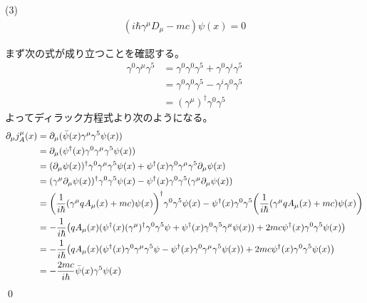 \documentclass[uplatex,dvipdfmx,a4paper,11pt]{jlreq}
\makeatletter
\theoremstyle{definition}
\renewenvironment{proof}[1][\proofname]{\par
  \normalfont
  \topsep6\p@\@plus6\p@ \trivlist
  \item[\hskip\labelsep{\bfseries #1}\@addpunct{\bfseries}]\ignorespaces\quad\par
}{%
  \qed\endtrivlist\@endpefalse
}
\renewcommand\proofname{証明}
\makeatother
\begin{document}
(3)
\begin{align}
  (i\hbar\gamma^\mu D_\mu - mc)\psi(x) = 0
\end{align}
\begin{proof}
  まず次の式が成り立つことを確認する。
  \begin{align}
    \gamma^0\gamma^\mu\gamma^5 & = \gamma^0\gamma^0\gamma^5 + \gamma^0\gamma^i\gamma^5 \\
                               & = \gamma^0\gamma^0\gamma^5 - \gamma^i\gamma^0\gamma^5 \\
                               & = (\gamma^\mu)^\dagger\gamma^0\gamma^5
  \end{align}
  よってディラック方程式より次のようになる。
  \begin{align}
    \partial_\mu j_A^\mu(x) & = \partial_\mu(\bar{\psi}(x)\gamma^\mu\gamma^5\psi(x))                                                                                                                                      \\
                            & = \partial_\mu(\psi^\dagger(x)\gamma^0\gamma^\mu\gamma^5\psi(x))                                                                                                                            \\
                            & = (\partial_\mu\psi(x))^\dagger\gamma^0\gamma^\mu\gamma^5\psi(x) + \psi^\dagger(x)\gamma^0\gamma^\mu\gamma^5\partial_\mu\psi(x)                                                             \\
                            & = (\gamma^\mu\partial_\mu\psi(x))^\dagger\gamma^0\gamma^5\psi(x) - \psi^\dagger(x)\gamma^0\gamma^5(\gamma^\mu\partial_\mu\psi(x))                                                           \\
                            & = \qty(\frac{1}{i\hbar}\qty(\gamma^\mu qA_\mu(x) + mc)\psi(x))^\dagger\gamma^0\gamma^5\psi(x) - \psi^\dagger(x)\gamma^0\gamma^5\qty(\frac{1}{i\hbar}\qty(\gamma^\mu qA_\mu(x) + mc)\psi(x)) \\
                            & = -\frac{1}{i\hbar}\qty(qA_\mu(x)(\psi^\dagger(x)(\gamma^\mu)^\dagger\gamma^0\gamma^5\psi + \psi^\dagger(x)\gamma^0\gamma^5\gamma^\mu \psi(x)) + 2mc\psi^\dagger(x)\gamma^0\gamma^5\psi(x)) \\
                            & = -\frac{1}{i\hbar}\qty(qA_\mu(x)(\psi^\dagger(x)\gamma^0\gamma^\mu\gamma^5\psi - \psi^\dagger(x)\gamma^0\gamma^\mu\gamma^5 \psi(x)) + 2mc\psi^\dagger(x)\gamma^0\gamma^5\psi(x))           \\
                            & = -\frac{2mc}{i\hbar}\bar{\psi}(x)\gamma^5\psi(x)
  \end{align}
\end{proof}
\end{document}
